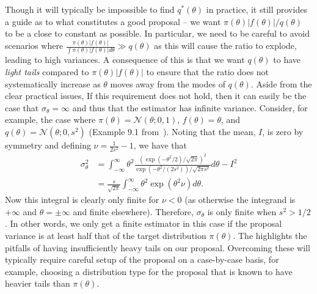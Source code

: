 Though it will typically be impossible to find $q^*(\theta)$ in practice, it still 
provides a guide as to what constitutes a good proposal -- we want
$\pi(\theta)\left|f(\theta)\right|/q(\theta)$ to be a close to constant as possible.
In particular, we need to be careful to avoid scenarios where 
$\frac{\pi(\theta)\left|f(\theta)\right|}{\int \pi(\theta)\left|f(\theta)\right|d\theta}
\gg q(\theta)$ as this will cause the ratio to explode, leading to high variances.
A consequence of this is that we want $q(\theta)$ to have \emph{light tails}
compared to $\pi(\theta)\left|f(\theta)\right|$ to ensure that the ratio does not
systematically increase as $\theta$ moves away from the modes of $q(\theta)$.
Aside from the clear practical issues, If this requirement does not hold, then
it can easily be the case that $\sigma_{\theta}=\infty$ and thus that the estimator
has infinite variance.  Consider, for example, the case where 
$\pi(\theta) = \mathcal{N}(\theta ; 0,1)$, $f(\theta)=\theta$, and
$q(\theta) = \mathcal{N}(\theta ; 0,s^2)$ (Example 9.1 from~\cite{owen2013mc}).
Noting that the mean, $I$, is zero by symmetry and defining $\nu = \frac{1}{2s^2}-1$, we have that
\begin{align}
\sigma_{\theta}^2 &= \int_{-\infty}^{\infty} \theta^2 \frac{\left(\exp\left(-\theta^2/2\right)/\sqrt{2\pi}\right)^2}
{\exp\left(-\theta^2/\left(2s^2\right)\right)/\sqrt{2\pi s^2}} d\theta
-I^2 \nonumber \\
&= \frac{s}{\sqrt{2\pi}}  \int_{-\infty}^{\infty} \theta^2 \exp \left(\theta^2 \nu\right) d\theta.
\end{align}
Now this integral is clearly only finite for $\nu < 0$ (as otherwise the integrand
is $+\infty$ and $\theta = \pm \infty$ and finite elsewhere).  Therefore, $\sigma_{\theta}$
is only finite when $s^2>1/2$.  In other words, we only get a finite estimator
in this case if the proposal variance is at least half that of the target distribution $\pi(\theta)$.
The highlights the pitfalls of having insufficiently heavy tails on our proposal.
Overcoming these will typically require careful setup of the proposal on a case-by-case basis,
for example, choosing a distribution type for the proposal that is known to have heavier tails 
than $\pi(\theta)$.

